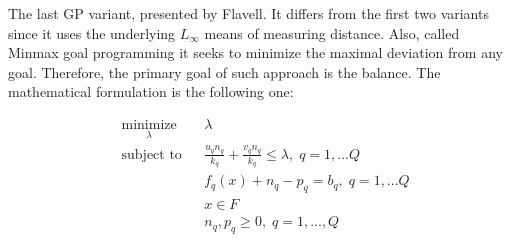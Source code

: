 \begin{doublespace}
The last GP variant, presented by Flavell. It differs from the first two variants since it uses the underlying $ L_\infty $ means of measuring distance. Also, called Minmax goal programming it seeks to minimize the maximal deviation from any goal. Therefore, the primary goal of such approach is the balance. The mathematical formulation is the following one:

\begin{equation*}
\begin{aligned}
& \underset{\lambda}{\text{minimize}}
& & \lambda \\
& \text{subject to}
& & \frac{u_q n_q}{k_q}+\frac{v_q n_q}{k_q}\leq\lambda, \; q=1,...Q \\
& & & f_q(x)+n_q-p_q=b_q, \; q=1,...Q \\
& & & x\in F \\
& & & n_q,p_q\geq 0, \; q=1,...,Q 
\end{aligned}
\end{equation*}

\end{doublespace}
\clearpage{\pagestyle{empty}\cleardoublepage}
